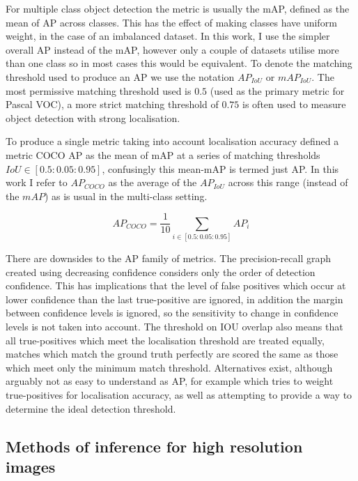 For multiple class object detection the metric is usually the \gls{mAP}, defined as the mean of \gls{AP} across classes. This has the effect of making classes have uniform weight, in the case of an imbalanced dataset.  In this work, I use the simpler overall \gls{AP} instead of the \gls{mAP}, however only a couple of datasets utilise more than one class so in most cases this would be equivalent. To denote the matching threshold used to produce an \gls{AP} we use the notation $AP_{IoU}$ or $mAP_{IoU}$. The most permissive matching threshold used is $0.5$ (used as the primary metric for Pascal VOC), a more strict matching threshold of $0.75$ is often used to measure object detection with strong localisation.

To produce a single metric taking into account localisation accuracy \cite{Lin2014} defined a metric COCO \gls{AP} as the mean of \gls{mAP} at a series of matching thresholds $ IoU \in [0.5 : 0.05 : 0.95] $, confusingly this mean-\gls{mAP} is termed just \gls{AP}. In this work I refer to $AP_{COCO}$ as the average of the $AP_{IoU}$ across this range (instead of the $mAP$) as is usual in the multi-class setting.

\begin{equation}
AP_{COCO} = \frac{1}{10}\sum_{i \in [0.5 : 0.05 : 0.95]}AP_{i}
\label{eq:ap_coco}
\end{equation}

There are downsides to the \gls{AP} family of metrics. The precision-recall graph created using decreasing confidence considers only the order of detection confidence. This has implications that the level of false positives which occur at lower confidence than the last true-positive are ignored, in addition the margin between confidence levels is ignored, so the sensitivity to change in confidence levels is not taken into account. The threshold on \gls{IOU} overlap also means that all true-positives which meet the localisation threshold are treated equally, matches which match the ground truth perfectly are scored the same as those which meet only the minimum match threshold. Alternatives exist, although arguably not as easy to understand as \gls{AP}, for example \cite{Oksuz2018} which tries to weight true-positives for localisation accuracy, as well as attempting to provide a way to determine the ideal detection threshold.


\subsection{Methods of inference for high resolution images}
\label{sec:highres_inference}

